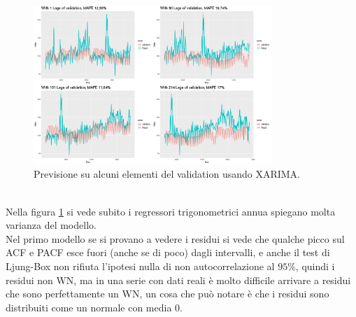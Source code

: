 \documentclass[12pt, onecolumn]{article}
\begin{document}
\begin{figure}[!h]
  \centering
  \includegraphics[width=\linewidth,height=6cm]{imgs/forecast_arima.png}
  \caption{Previsione su alcuni elementi del validation usando XARIMA.}
  \label{fig:XARIMA_pred}
\end{figure}\\
Nella figura \ref{fig:XARIMA_pred} si vede subito i regressori trigonometrici annua spiegano molta varianza del modello.\\
Nel primo modello se si provano a vedere i residui si vede che qualche picco sul ACF e PACF esce fuori (anche se di poco) dagli intervalli, e anche il test di Ljung-Box non rifiuta l'ipotesi nulla di non autocorrelazione al $95\%$, quindi i residui non WN, ma in una serie con dati reali è molto difficile arrivare a residui che sono perfettamente un WN, un cosa che può notare è che i residui sono distribuiti come un normale con media 0.
%
\end{document}
